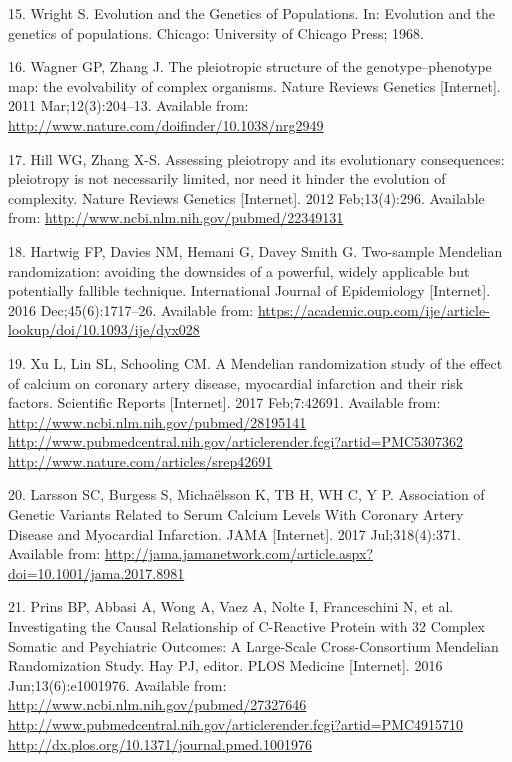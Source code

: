 \documentclass[]{article}
\begin{document}
\hypertarget{ref-Wright1968}{}
15. Wright S. Evolution and the Genetics of Populations. In: Evolution
and the genetics of populations. Chicago: University of Chicago Press;
1968.

\hypertarget{ref-Wagner2011}{}
16. Wagner GP, Zhang J. The pleiotropic structure of the
genotype--phenotype map: the evolvability of complex organisms. Nature
Reviews Genetics {[}Internet{]}. 2011 Mar;12(3):204--13. Available from:
\url{http://www.nature.com/doifinder/10.1038/nrg2949}

\hypertarget{ref-Hill2012a}{}
17. Hill WG, Zhang X-S. Assessing pleiotropy and its evolutionary
consequences: pleiotropy is not necessarily limited, nor need it hinder
the evolution of complexity. Nature Reviews Genetics {[}Internet{]}.
2012 Feb;13(4):296. Available from:
\url{http://www.ncbi.nlm.nih.gov/pubmed/22349131}

\hypertarget{ref-Hartwig2016}{}
18. Hartwig FP, Davies NM, Hemani G, Davey Smith G. Two-sample Mendelian
randomization: avoiding the downsides of a powerful, widely applicable
but potentially fallible technique. International Journal of
Epidemiology {[}Internet{]}. 2016 Dec;45(6):1717--26. Available from:
\url{https://academic.oup.com/ije/article-lookup/doi/10.1093/ije/dyx028}

\hypertarget{ref-Xu2017}{}
19. Xu L, Lin SL, Schooling CM. A Mendelian randomization study of the
effect of calcium on coronary artery disease, myocardial infarction and
their risk factors. Scientific Reports {[}Internet{]}. 2017 Feb;7:42691.
Available from:
\href{http://www.ncbi.nlm.nih.gov/pubmed/28195141\%20http://www.pubmedcentral.nih.gov/articlerender.fcgi?artid=PMC5307362\%20http://www.nature.com/articles/srep42691}{http://www.ncbi.nlm.nih.gov/pubmed/28195141 http://www.pubmedcentral.nih.gov/articlerender.fcgi?artid=PMC5307362 http://www.nature.com/articles/srep42691}

\hypertarget{ref-Larsson2017}{}
20. Larsson SC, Burgess S, Michaëlsson K, TB H, WH C, Y P. Association
of Genetic Variants Related to Serum Calcium Levels With Coronary Artery
Disease and Myocardial Infarction. JAMA {[}Internet{]}. 2017
Jul;318(4):371. Available from:
\url{http://jama.jamanetwork.com/article.aspx?doi=10.1001/jama.2017.8981}

\hypertarget{ref-Prins2016}{}
21. Prins BP, Abbasi A, Wong A, Vaez A, Nolte I, Franceschini N, et al.
Investigating the Causal Relationship of C-Reactive Protein with 32
Complex Somatic and Psychiatric Outcomes: A Large-Scale Cross-Consortium
Mendelian Randomization Study. Hay PJ, editor. PLOS Medicine
{[}Internet{]}. 2016 Jun;13(6):e1001976. Available from:
\href{http://www.ncbi.nlm.nih.gov/pubmed/27327646\%20http://www.pubmedcentral.nih.gov/articlerender.fcgi?artid=PMC4915710\%20http://dx.plos.org/10.1371/journal.pmed.1001976}{http://www.ncbi.nlm.nih.gov/pubmed/27327646 http://www.pubmedcentral.nih.gov/articlerender.fcgi?artid=PMC4915710 http://dx.plos.org/10.1371/journal.pmed.1001976}
\end{document}
